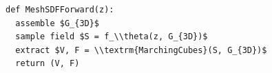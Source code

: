 \documentclass[border=10pt]{standalone}
\begin{document}
\begin{lstlisting}
def MeshSDFForward(z):
  assemble $G_{3D}$
  sample field $S = f_\\theta(z, G_{3D})$
  extract $V, F = \\textrm{MarchingCubes}(S, G_{3D})$
  return (V, F)
\end{lstlisting}
\end{document}
